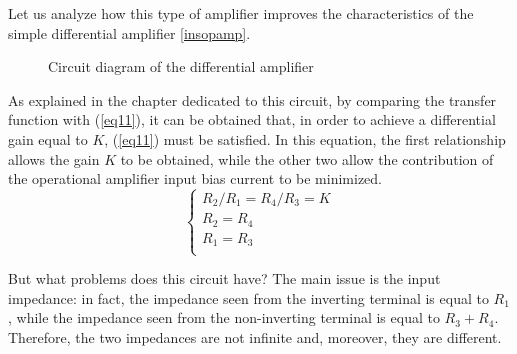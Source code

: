 \documentclass[../main.tex]{subfiles}
\begin{document}
Let us analyze how this type of amplifier improves the characteristics of the simple differential amplifier \autoref{insopamp}.

\begin{figure}[h!]
\begin{center}


\caption{Circuit diagram of the differential amplifier}
\label{insopamp}
\end{center}	
\end{figure}


As explained in the chapter dedicated to this circuit, by comparing the transfer function with (\autoref{eq11}), it can be obtained that, in order to achieve a differential gain equal to $K$, (\autoref{eq11}) must be satisfied. In this equation, the first relationship allows the gain $K$ to be obtained, while the other two allow the contribution of the operational amplifier input bias current to be minimized.\\

\begin{equation}
\begin{cases}
	R_2 / R_1 = R_4/R_3 = K\\
	R_2 = R_4\\
	R_1 = R_3\\	
\end{cases}
\label{sist}
\end{equation}

But what problems does this circuit have?  The main issue is the input impedance: in fact, the impedance seen from the inverting terminal is equal to $R_1$, while the impedance seen from the non-inverting terminal is equal to $R_3 + R_4$. 
Therefore, the two impedances are not infinite and, moreover, they are different.\\
\end{document}
